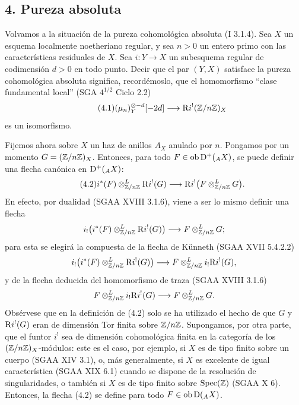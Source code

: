 \subsection*{4. Pureza absoluta}

Volvamos a la situación de la pureza cohomológica absoluta (I 3.1.4). Sea $X$ un esquema localmente noetheriano regular, y sea $n>0$ un entero primo con las características residuales de $X$. Sea $i:Y\to X$ un subesquema regular de codimensión $d>0$ en todo punto. Decir que el par $(Y,X)$ satisface la pureza cohomológica absoluta significa, recordémoslo, que el homomorfismo ``clase fundamental local'' (SGA $4^{1/2}$ Ciclo 2.2)
\begin{equation}\tag{4.1}
        (\mu_n)_Y^{\otimes -d}[-2d]\longrightarrow \mathrm{R} i^!(\mathbb{Z}/n\mathbb{Z})_X
\end{equation}
es un isomorfismo.

Fijemos ahora sobre $X$ un haz de anillos $A_X$ anulado por $n$. Pongamos por un momento $G=(\mathbb{Z}/n\mathbb{Z})_X$. Entonces, para todo $F\in\operatorname{ob}\mathrm{D}^+({}_A X)$, se puede definir una flecha canónica en $\mathrm{D}^+({}_A X)$:
\begin{equation}\tag{4.2}
        i^*(F)\otimes^L_{\mathbb{Z}/n\mathbb{Z}} \mathrm{R} i^!(G)\longrightarrow \mathrm{R} i^!\bigl(F\otimes^L_{\mathbb{Z}/n\mathbb{Z}}G\bigr).
\end{equation}
En efecto, por dualidad (SGAA XVIII 3.1.6), viene a ser lo mismo definir una flecha
\[
        i_!\bigl(i^*(F)\otimes^L_{\mathbb{Z}/n\mathbb{Z}}\mathrm{R} i^!(G)\bigr)\longrightarrow F\otimes^L_{\mathbb{Z}/n\mathbb{Z}}G;
\]
para esta se elegirá la compuesta de la flecha de Künneth (SGAA XVII 5.4.2.2)
\[
        i_!\bigl(i^*(F)\otimes^L_{\mathbb{Z}/n\mathbb{Z}}\mathrm{R} i^!(G)\bigr)\longrightarrow F\otimes^L_{\mathbb{Z}/n\mathbb{Z}}i_!\mathrm{R} i^!(G),
\]
y de la flecha deducida del homomorfismo de traza (SGAA XVIII 3.1.6)
\[
        F\otimes^L_{\mathbb{Z}/n\mathbb{Z}}i_!\mathrm{R} i^!(G)\longrightarrow F\otimes^L_{\mathbb{Z}/n\mathbb{Z}}G.
\]
Obsérvese que en la definición de (4.2) solo se ha utilizado el hecho de que $G$ y $\mathrm{R} i^!(G)$ eran de dimensión Tor finita sobre $\mathbb{Z}/n\mathbb{Z}$. Supongamos, por otra parte, que el funtor $i^!$ sea de dimensión cohomológica finita en la categoría de los $(\mathbb{Z}/n\mathbb{Z})_X$-módulos: este es el caso, por ejemplo, si $X$ es de tipo finito sobre un cuerpo (SGAA XIV 3.1), o, más generalmente, si $X$ es excelente de igual característica (SGAA XIX 6.1) cuando se dispone de la resolución de singularidades, o también si $X$ es de tipo finito sobre $\operatorname{Spec}(\mathbb{Z})$ (SGAA X 6). Entonces, la flecha (4.2) se define para todo $F\in\operatorname{ob}\mathrm{D}({}_A X)$.

